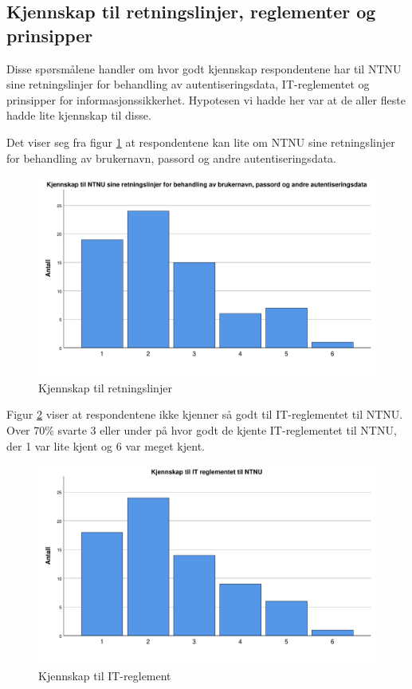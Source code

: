 \subsection{Kjennskap til retningslinjer, reglementer og prinsipper}
Disse spørsmålene handler om hvor godt kjennskap respondentene har til NTNU sine retningslinjer for behandling av autentiseringsdata, IT-reglementet og prinsipper for informasjonssikkerhet. Hypotesen vi hadde her var at de aller fleste hadde lite kjennskap til disse.

Det viser seg fra figur \ref{fig:case2-retningslinjer} at respondentene kan lite om NTNU sine retningslinjer for behandling av brukernavn, passord og andre autentiseringsdata. 
\begin{figure}[H]
    \centering
    \includegraphics[scale=0.5]{case_2/bilder/spss/retningslinjer.pdf}
    \caption[Kjennskap til retningslinjer]{Kjennskap til retningslinjer}
    \label{fig:case2-retningslinjer}
\end{figure}

Figur \ref{fig:case2-ITreglement} viser at respondentene ikke kjenner så godt til IT-reglementet til NTNU. Over 70\% svarte 3 eller under på hvor godt de kjente IT-reglementet til NTNU, der 1 var lite kjent og 6 var meget kjent.  
\begin{figure}[H]
    \centering
    \includegraphics[scale=0.5]{case_2/bilder/spss/ITreglement.pdf}
    \caption[Kjennskap til IT-reglement]{Kjennskap til IT-reglement}
    \label{fig:case2-ITreglement}
\end{figure}

